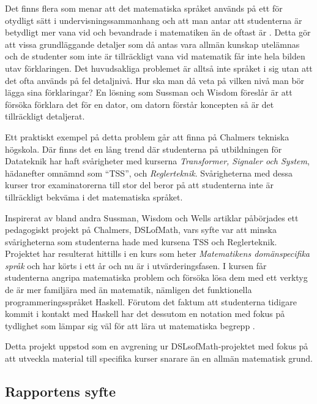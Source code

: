 \documentclass[]{article}
\begin{document}
Det finns flera som menar att det matematiska språket används på ett för
otydligt sätt i undervisningssammanhang och att man antar att studenterna
är betydligt mer vana vid och bevandrade i matematiken än de oftast är \cite{sussman2002role} \cite{wells1995communicating}.
Detta gör att vissa grundläggande detaljer som då antas vara allmän kunskap
utelämnas och de studenter som inte är tillräckligt vana vid matematik får inte
hela bilden utav förklaringen.
Det huvudsakliga problemet är alltså inte språket i sig utan att det ofta
används på fel detaljnivå. Hur ska man då veta på vilken nivå man bör lägga
sina förklaringar? En lösning som Sussman och Wisdom föreslår är att
försöka förklara det för en dator, om datorn förstår koncepten så är det
tillräckligt detaljerat.

Ett praktiskt exempel på detta problem går att finna på Chalmers tekniska högskola.
Där finns det en lång trend där studenterna på utbildningen för Datateknik har
haft svårigheter med kurserna \textit{Transformer, Signaler och System}, hädanefter
omnämnd som ``\gls{TSS}'', och \textit{Reglerteknik}.
Svårigheterna med dessa kurser tror examinatorerna till stor del beror på att
studenterna inte är tillräckligt bekväma i det matematiska språket.

Inspirerat av bland andra Sussman, Wisdom och Wells artiklar påbörjades ett
pedagogiskt projekt på Chalmers, \gls{DSLofMath}, vars syfte var att minska
svårigheterna som studenterna hade med kursena TSS och Reglerteknik.
Projektet har resulterat hittills i en kurs som heter
\textit{Matematikens domänspecifika språk} och har körts i ett år och nu
är i utvärderingsfasen. I kursen får studenterna angripa
matematiska problem och försöka lösa dem med ett verktyg de är
mer familjära med än matematik, nämligen det funktionella
programmerings\-språket Haskell. Förutom det faktum att studenterna tidigare
kommit i kontakt med Haskell har det dessutom en notation med fokus på
tydlighet som lämpar sig väl för att lära ut matematiska begrepp
\cite{TFPIE15_DSLsofMath_IonescuJansson}.

Detta projekt uppstod som en avgrening ur DSLsofMath-projektet med fokus
på att utveckla material till specifika kurser snarare än en allmän matematisk grund.

\subsection{Rapportens syfte}
\end{document}
